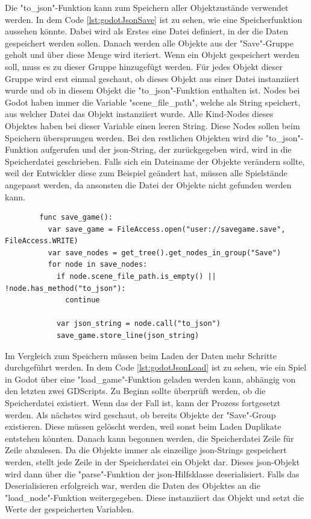 Die "to\_json"-Funktion kann zum Speichern aller Objektzustände verwendet werden. In dem Code \ref{lst:godotJsonSave} ist zu sehen, wie eine Speicherfunktion aussehen könnte. Dabei wird als Erstes eine Datei definiert, in der die Daten gespeichert werden sollen. Danach werden alle Objekte aus der "Save"-Gruppe geholt und über diese Menge wird iteriert. Wenn ein Objekt gespeichert werden soll, muss es zu dieser Gruppe hinzugefügt werden. Für jedes Objekt dieser Gruppe wird erst einmal geschaut, ob dieses Objekt aus einer Datei instanziiert wurde und ob in diesem Objekt die "to\_json"-Funktion enthalten ist. Nodes bei Godot haben immer die Variable "scene\_file\_path", welche als String speichert, aus welcher Datei das Objekt instanziiert wurde. Alle Kind-Nodes dieses Objektes haben bei dieser Variable einen leeren String.\cite{godotengineNode} Diese Nodes sollen beim Speichern übersprungen werden. Bei den restlichen Objekten wird die "to\_json"-Funktion aufgerufen und der \ac{json}-String, der zurückgegeben wird, wird in die Speicherdatei geschrieben.\cite{godotengineSavingGames} Falls sich ein Dateiname der Objekte verändern sollte, weil der Entwickler diese zum Beispiel geändert hat, müssen alle Spielstände angepasst werden, da ansonsten die Datei der Objekte nicht gefunden werden kann.

\begin{listing}[htp]
    \begin{verbatim}
        func save_game():
          var save_game = FileAccess.open("user://savegame.save", FileAccess.WRITE)
          var save_nodes = get_tree().get_nodes_in_group("Save")
          for node in save_nodes:
            if node.scene_file_path.is_empty() || !node.has_method("to_json"): 
              continue 

            var json_string = node.call("to_json")
            save_game.store_line(json_string)
    \end{verbatim}
    \caption{Speichern aller JSON-Daten der Knoten aus der "Save"-Gruppe \cite{godotengineSavingGames}}
    \label{lst:godotJsonSave}
\end{listing}

Im Vergleich zum Speichern müssen beim Laden der Daten mehr Schritte durchgeführt werden. In dem Code \ref{lst:godotJsonLoad} ist zu sehen, wie ein Spiel in Godot über eine "load\_game"-Funktion geladen werden kann, abhängig von den letzten zwei GDScripts. Zu Beginn sollte überprüft werden, ob die Speicherdatei existiert. Wenn das der Fall ist, kann der Prozess fortgesetzt werden. Als nächstes wird geschaut, ob bereits Objekte der "Save"-Group existieren. Diese müssen gelöscht werden, weil sonst beim Laden Duplikate entstehen könnten. Danach kann begonnen werden, die Speicherdatei Zeile für Zeile abzulesen. Da die Objekte immer als einzeilige \ac{json}-Strings gespeichert werden, stellt jede Zeile in der Speicherdatei ein Objekt dar. Dieses \ac{json}-Objekt wird dann über die "parse"-Funktion der \ac{json}-Hilfsklasse deserialisiert. Falls das Deserialisieren erfolgreich war, werden die Daten des Objektes an die "load\_node"-Funktion weitergegeben. Diese instanziiert das Objekt und setzt die Werte der gespeicherten Variablen.\cite{godotengineSavingGames}

